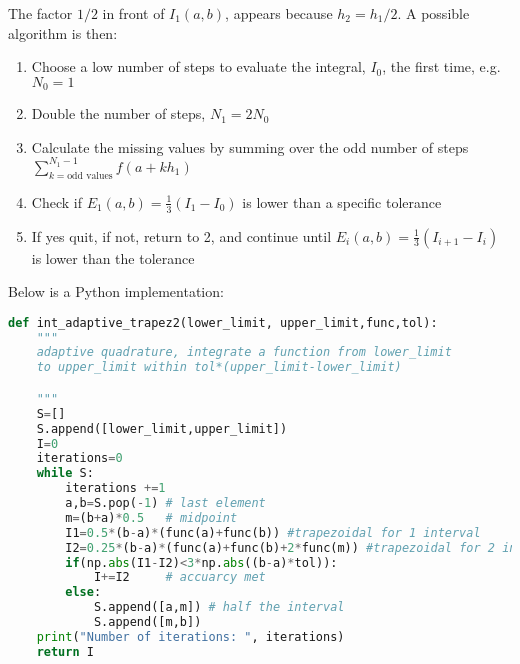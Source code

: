\documentclass[graybox,sectrefs,envcountresetchap,open=right,final]{svmonodo}
\begin{document}
The factor $1/2$ in front of $I_1(a,b)$, appears because $h_2=h_1/2$. 
A possible algorithm is then:
\begin{enumerate}
\item Choose a low number of steps to evaluate the integral, $I_0$, the first time, e.g.~$N_0=1$

\item Double the number of steps, $N_1=2N_0$ 

\item Calculate the missing values by summing over the odd number of steps $\sum_{k=\text{odd values}}^{N_1-1}f(a+k h_1)$

\item Check if $E_1(a,b)=\frac{1}{3}(I_1-I_0)$ is lower than a specific tolerance

\item If yes quit, if not, return to 2, and continue until $E_i(a,b)=\frac{1}{3}(I_{i+1}-I_{i})$ is lower than the tolerance  
\end{enumerate}

\noindent
Below is a Python implementation:
























\begin{lstlisting}[language=python,style=blue1]
def int_adaptive_trapez2(lower_limit, upper_limit,func,tol):
    """
    adaptive quadrature, integrate a function from lower_limit
    to upper_limit within tol*(upper_limit-lower_limit)

    """
    S=[]
    S.append([lower_limit,upper_limit])
    I=0
    iterations=0
    while S:
        iterations +=1
        a,b=S.pop(-1) # last element
        m=(b+a)*0.5   # midpoint
        I1=0.5*(b-a)*(func(a)+func(b)) #trapezoidal for 1 interval 
        I2=0.25*(b-a)*(func(a)+func(b)+2*func(m)) #trapezoidal for 2 intervals
        if(np.abs(I1-I2)<3*np.abs((b-a)*tol)):
            I+=I2     # accuarcy met
        else:
            S.append([a,m]) # half the interval 
            S.append([m,b])
    print("Number of iterations: ", iterations)
    return I

\end{lstlisting}
\end{document}

